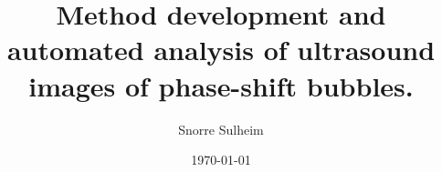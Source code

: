 \titlepage
\title{ Method development and automated analysis of ultrasound images of phase-shift bubbles.}
\author{Snorre Sulheim}
\date{\today}
\maketitle